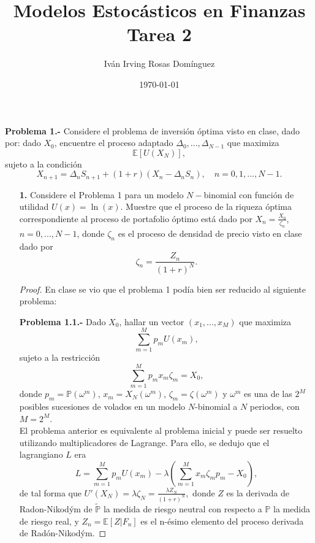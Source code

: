 \documentclass[letterpaper]{article}
\title{\textbf{Modelos Estocásticos en Finanzas\\
Tarea 2}}
\author{Iván Irving Rosas Domínguez}
\date{\today}
\newcommand{\E}{\mathbb{E}}
\renewcommand{\P}{\mathbb{P}}
\newcommand{\1}{\mathds{1}}
\theoremstyle{definition}
\theoremstyle{definition}
\theoremstyle{definition}
\theoremstyle{definition}
\theoremstyle{definition}
\begin{document}
\maketitle

\textbf{Problema 1.-} Considere el problema de inversión óptima visto en clase, dado por: dado $X_0$, encuentre el proceso adaptado $\Delta_0,...,\Delta_{N-1}$
que maximiza
\[
\E\left[U(X_N)\right],    
\]
sujeto a la condición 
\[
X_{n+1}=\Delta_nS_{n+1}+(1+r)(X_n-\Delta_nS_n), \quad n=0,1,...,N-1.    
\]
\begin{enumerate}
    \item[\textbf{1.}] Considere el Problema 1 para un modelo $N-$binomial con función de utilidad $U(x)=\ln(x)$. Muestre que el proceso de la riqueza óptima
    correspondiente al proceso de portafolio óptimo está dado por $X_n=\frac{X_0}{\zeta_n}$, $n=0,...,N-1$, donde $\zeta_n$ es el proceso de 
    densidad de precio visto en clase dado por
    \[
    \zeta_n=\frac{Z_n}{(1+r)^{N}}.    
    \]
    \begin{proof} 
       En clase se vio que el problema 1 podía bien ser reducido al siguiente problema:

       \textbf{Problema 1.1.-} Dado $X_0$, hallar un vector $(x_1,...,x_M)$ que maximiza 
       \[
       \sum_{m=1}^{M}p_mU(x_m), 
       \] 
       sujeto a la restricción 
       \[
       \sum_{m=1}^M p_mx_m\zeta_m=X_0,
       \]
       donde $p_m=\P(\omega^m)$, $x_m=X_N(\omega^m)$, $\zeta_m=\zeta(\omega^{m})$ y $\omega^m$ es una de las $2^{M}$ posibles sucesiones
       de volados en un modelo $N$-binomial a $N$ periodos, con $M=2^{M}$.\\
       
       El problema anterior es equivalente al problema inicial y puede ser resuelto utilizando 
       multiplicadores de Lagrange. Para ello, se dedujo que el lagrangiano $L$ era 
       \[
        L=\sum_{m=1}^{M}p_mU(x_m)-\lambda \left(\sum_{m=1}^Mx_m\zeta_mp_m-X_0\right),
       \]   
       de tal forma que $U'(X_N)=\lambda\zeta_N=\frac{\lambda Z_N}{(1+r)^N},$ donde $Z$ es la
       derivada de Radon-Nikodým de $\tilde{\P}$ la medida de riesgo neutral con respecto a $\P$ la medida
       de riesgo real, y $Z_n=\E\left[Z|F_n\right]$ es el n-ésimo elemento del proceso derivada de Radón-Nikodým.
       

\end{proof}
\end{enumerate}
\end{document}
